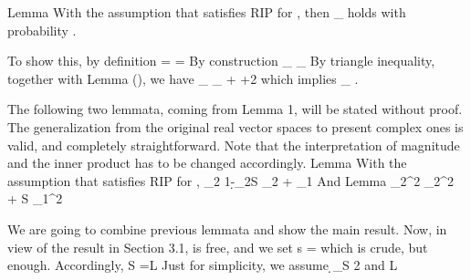 \Result
{Lemma}
{
With the assumption that  satisfies RIP for , then
%
 {
\NC {} _\infty
\leq {}  \NR
}
%
holds with probability .
}

To show this, by definition
%
 {
\NC {}
= \NC {} \NR
\NC = \NC {} \NR
}
%
By construction
%
 {
\NC {} _\infty
\leq \NC {} _\infty \NR
\NC \leq {} \NR
}
%
By triangle inequality, together with Lemma (), we have
%
 {
\NC {} _\infty
\leq \NC {} _\infty
+ \NR
\NC \leq {}  +2  \NR
}
%
which implies
%
 {
\NC {} _\infty
\leq {} . \NR
}

The following two lemmata, coming from  Lemma 1, will be stated without proof.
The generalization from the original real vector spaces to present complex ones is valid, and completely straightforward.
Note that the interpretation of magnitude and the inner product has to be changed accordingly.
\Result
{Lemma}
{
With the assumption that  satisfies RIP for ,
%
 {
\NC {} _2
\leq \NC {} {1-\d_{2S}}  _2 + { }  _1 \NR
}
}
%
And
\Result
{Lemma}
{
%
 {
\NC {} _2^2
\leq \NC {} _2^2 + {S}  _1^2 \NR
}
}

\stopsubsection

\startsubsection [title={Main Result}]

We are going to combine previous lemmata and show the main result.
Now, in view of the result in Section 3.1,  is free, and we set
%
 {
\NC s
= \NR
}
%
which is crude, but enough.
Accordingly,
%
 {
\NC S
=\NC L  \NR
}
%
Just for simplicity, we assume
%
 {
\NC \d_S
\leq \NC {} {2} \NR
}
%
and
%
 {
\NC L
\geq {} \NR
}

